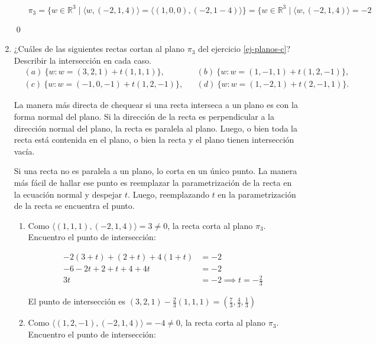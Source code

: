 \begin{enumerate}[resume,topsep=6pt, itemsep=.4cm]
\begin{enumerate}
$\pi_3 = \{ w \in \mathbb{R}^3 \; | \; \langle w, (-2,1,4) \rangle =  \langle (1,0,0), (-2,1-4) \rangle \} = \boxed{  \{ w \in \mathbb{R}^3 \; | \; \langle w, (-2,1,4) \rangle =  -2 }$
	
\end{enumerate}

\qed

\item ¿Cuáles de las siguientes rectas cortan al plano $\pi_3$ del  ejercicio \ref{ej-planos-c}?
Describir la intersecci{ó}n en cada caso.
\begin{align*}
&(a) \ \{w: w=(3,2,1)+t(1,1,1)\}, && (b) \  \{w: w=(1,-1,1)+t(1,2,-1)\}, \\
&(c)\  \{w: w=(-1,0,-1)+t(1,2,-1)\}, && (d) \  \{w: w=(1,-2,1)+t(2,-1,1)\}.
\end{align*}


\rta La manera más directa de chequear si una recta interseca a un plano es con la forma normal del plano. Si la dirección de la recta es perpendicular a la dirección normal del plano, la recta es paralela al plano. Luego, o bien toda la recta está contenida en el plano, o bien la recta y el plano tienen intersección vacía.

Si una recta no es paralela a un plano, lo corta en un único punto. La manera más fácil de hallar ese punto es reemplazar la parametrización de la recta en la ecuación normal y despejar $t$. Luego, reemplazando $t$ en la parametrización de la recta se encuentra el punto.

\begin{enumerate}
\item Como $\langle (1,1,1),(-2,1,4) \rangle  = 3 \neq 0 $, la recta corta al plano $\pi_3$. Encuentro el punto de intersección:

\begin{equation*}
\begin{array}{rl}
-2 (3+t) + (2+t) + 4 (1+t) &= -2 \\
-6 - 2t + 2+t + 4 + 4t  &= -2 \\
3t  &= -2 \implies \boxed{t=-\frac{2}{3}}
\end{array}
\end{equation*}

El punto de intersección es $(3,2,1) - \frac{2}{3} (1,1,1) = \boxed{ \left( \frac{7}{3} , \frac{4}{3} , \frac{1}{3} \right) }$

\item Como $\langle (1,2,-1),(-2,1,4) \rangle  = -4 \neq 0 $, la recta corta al plano $\pi_3$. Encuentro el punto de intersección:


\end{enumerate}
\end{enumerate}
